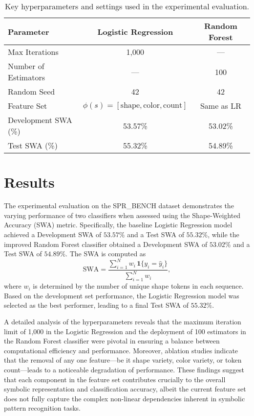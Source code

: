 \documentclass{article}
\begin{document}
\begin{table}[h]
\centering
\begin{tabular}{lcc}
\hline
\textbf{Parameter} & \textbf{Logistic Regression} & \textbf{Random Forest} \\
\hline
Max Iterations & 1,000 & --- \\
Number of Estimators & --- & 100 \\
Random Seed & 42 & 42 \\
Feature Set & \(\phi(s) = [\text{shape}, \text{color}, \text{count}]\) & Same as LR \\
Development SWA (\%) & 53.57\% & 53.02\% \\
Test SWA (\%) & 55.32\% & 54.89\% \\
\hline
\end{tabular}
\caption{Key hyperparameters and settings used in the experimental evaluation.}
\label{tab:hyperparams}
\end{table}

\section{Results}
The experimental evaluation on the SPR\_BENCH dataset demonstrates the varying performance of two classifiers when assessed using the Shape-Weighted Accuracy (SWA) metric. Specifically, the baseline Logistic Regression model achieved a Development SWA of \(53.57\%\) and a Test SWA of \(55.32\%\), while the improved Random Forest classifier obtained a Development SWA of \(53.02\%\) and a Test SWA of \(54.89\%\). The SWA is computed as
\[
\text{SWA} = \frac{\sum_{i=1}^{N} w_i\, \mathbf{1}\{y_i=\hat{y}_i\}}{\sum_{i=1}^{N} w_i},
\]
where \(w_i\) is determined by the number of unique shape tokens in each sequence. Based on the development set performance, the Logistic Regression model was selected as the best performer, leading to a final Test SWA of \(55.32\%\).

A detailed analysis of the hyperparameters reveals that the maximum iteration limit of 1,000 in the Logistic Regression and the deployment of 100 estimators in the Random Forest classifier were pivotal in ensuring a balance between computational efficiency and performance. Moreover, ablation studies indicate that the removal of any one feature—be it shape variety, color variety, or token count—leads to a noticeable degradation of performance. These findings suggest that each component in the feature set contributes crucially to the overall symbolic representation and classification accuracy, albeit the current feature set does not fully capture the complex non-linear dependencies inherent in symbolic pattern recognition tasks.
\end{document}
